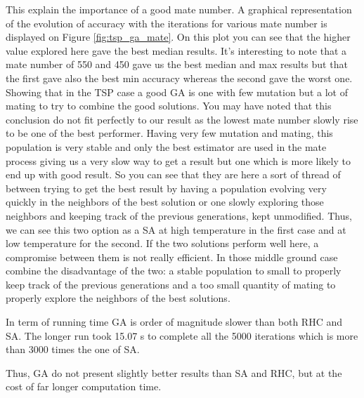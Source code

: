 \documentclass[twocolumn,a4paper,10pt]{article}
\begin{document}
This explain the importance of a good mate number. A graphical representation of the evolution of accuracy with the iterations for various mate number is displayed on Figure \ref{fig:tsp_ga_mate}. On this plot you can see that the higher value explored here gave the best median results. It's interesting to note that a mate number of 550 and 450 gave us the best median and max results but that the first gave also the best min accuracy whereas the second gave the worst one. Showing that in the TSP case a good GA is one with few mutation but a lot of mating to try to combine the good solutions. You may have noted that this conclusion do not fit perfectly to our result as the lowest mate number slowly rise to be one of the best performer. Having very few mutation and mating, this population is very stable and only the best estimator are used in the mate process giving us a very slow way to get a result but one which is more likely to end up with good result. So you can see that they are here a sort of thread of between trying to get the best result by having a population evolving very quickly in the neighbors of the best solution or one slowly exploring those neighbors and keeping track of the previous generations, kept unmodified. Thus, we can see this two option as a SA at high temperature in the first case and at low temperature for the second. If the two solutions perform well here, a compromise between them is not really efficient. In those middle ground case combine the disadvantage of the two: a stable population to small to properly keep track of the previous generations and a too small quantity of mating to properly explore the neighbors of the best solutions.

In term of running time GA is order of magnitude slower than both RHC and SA. The longer run took 15.07 s to complete all the 5000 iterations which is more than 3000 times the one of SA.

Thus, GA do not present slightly better results than SA and RHC, but at the cost of far longer computation time.
\end{document}
